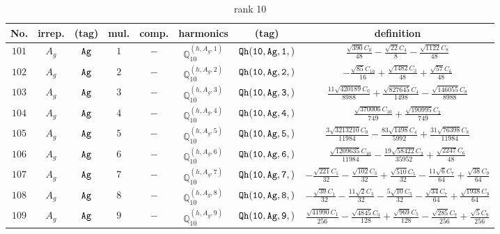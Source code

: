 \documentclass[fleqn,8pt]{jsarticle}
\begin{document}
\begin{table}[ht!]
\begin{center}
\caption{rank 10}
\renewcommand{\arraystretch}{1.3}
\begin{tabular}{cccccccc} \hline \hline
No. & irrep. & (tag) & mul. & comp. & harmonics & (tag) & definition \\ \hline
$ 101 $ & $ A_{g} $ & $ {\tt Ag} $ & $ 1 $ & $ - $ & $ \mathbb{Q}_{10}^{(h,A_{g},1)} $ & $ {\tt Qh(10,Ag,1,)} $ & $ \frac{\sqrt{390} C_{0}}{48} - \frac{\sqrt{22} C_{4}}{8} - \frac{\sqrt{1122} C_{8}}{48} $ \\
$ 102 $ & $ A_{g} $ & $ {\tt Ag} $ & $ 2 $ & $ - $ & $ \mathbb{Q}_{10}^{(h,A_{g},2)} $ & $ {\tt Qh(10,Ag,2,)} $ & $ - \frac{\sqrt{85} C_{10}}{16} + \frac{\sqrt{1482} C_{2}}{48} + \frac{\sqrt{57} C_{6}}{48} $ \\
$ 103 $ & $ A_{g} $ & $ {\tt Ag} $ & $ 3 $ & $ - $ & $ \mathbb{Q}_{10}^{(h,A_{g},3)} $ & $ {\tt Qh(10,Ag,3,)} $ & $ \frac{11 \sqrt{420189} C_{0}}{8988} + \frac{\sqrt{827645} C_{4}}{1498} - \frac{\sqrt{146055} C_{8}}{8988} $ \\
$ 104 $ & $ A_{g} $ & $ {\tt Ag} $ & $ 4 $ & $ - $ & $ \mathbb{Q}_{10}^{(h,A_{g},4)} $ & $ {\tt Qh(10,Ag,4,)} $ & $ \frac{\sqrt{370006} C_{10}}{749} + \frac{\sqrt{190995} C_{2}}{749} $ \\
$ 105 $ & $ A_{g} $ & $ {\tt Ag} $ & $ 5 $ & $ - $ & $ \mathbb{Q}_{10}^{(h,A_{g},5)} $ & $ {\tt Qh(10,Ag,5,)} $ & $ \frac{3 \sqrt{3213210} C_{0}}{11984} - \frac{83 \sqrt{1498} C_{4}}{5992} + \frac{31 \sqrt{76398} C_{8}}{11984} $ \\
$ 106 $ & $ A_{g} $ & $ {\tt Ag} $ & $ 6 $ & $ - $ & $ \mathbb{Q}_{10}^{(h,A_{g},6)} $ & $ {\tt Qh(10,Ag,6,)} $ & $ \frac{\sqrt{1209635} C_{10}}{11984} - \frac{19 \sqrt{58422} C_{2}}{35952} + \frac{\sqrt{2247} C_{6}}{48} $ \\
$ 107 $ & $ A_{g} $ & $ {\tt Ag} $ & $ 7 $ & $ - $ & $ \mathbb{Q}_{10}^{(h,A_{g},7)} $ & $ {\tt Qh(10,Ag,7,)} $ & $ - \frac{\sqrt{221} C_{1}}{32} - \frac{\sqrt{102} C_{3}}{32} + \frac{\sqrt{510} C_{5}}{32} - \frac{11 \sqrt{6} C_{7}}{64} + \frac{\sqrt{38} C_{9}}{64} $ \\
$ 108 $ & $ A_{g} $ & $ {\tt Ag} $ & $ 8 $ & $ - $ & $ \mathbb{Q}_{10}^{(h,A_{g},8)} $ & $ {\tt Qh(10,Ag,8,)} $ & $ - \frac{\sqrt{39} C_{1}}{32} - \frac{11 \sqrt{2} C_{3}}{32} - \frac{5 \sqrt{10} C_{5}}{32} - \frac{\sqrt{34} C_{7}}{64} + \frac{\sqrt{1938} C_{9}}{64} $ \\
$ 109 $ & $ A_{g} $ & $ {\tt Ag} $ & $ 9 $ & $ - $ & $ \mathbb{Q}_{10}^{(h,A_{g},9)} $ & $ {\tt Qh(10,Ag,9,)} $ & $ \frac{\sqrt{41990} C_{1}}{256} - \frac{\sqrt{4845} C_{3}}{128} + \frac{\sqrt{969} C_{5}}{128} - \frac{\sqrt{285} C_{7}}{256} + \frac{\sqrt{5} C_{9}}{256} $ \\

\end{tabular}
\end{center}
\end{table}
\end{document}
